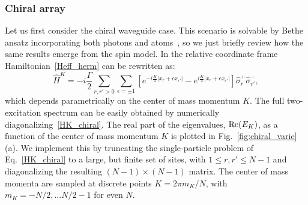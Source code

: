 \documentclass[pra,twocolumn,showpacs,preprintnumbers,amsmath,amssymb]{revtex4-1}
\begin{document}
\subsubsection{Chiral array}\label{Sec_chiral2ex}

Let us first consider the chiral waveguide case. This scenario is solvable by Bethe ansatz incorporating both photons and atoms~\cite{mahmo_calajo}, so we just briefly review how the same results emerge from the spin model. In the relative coordinate frame  Hamiltonian~\eqref{Heff_herm} can be rewritten as:
\begin{equation}\label{HK_chiral}
\hat H^K=-i\frac{\Gamma}{2}\sum_{r,r'>0}\sum_{\epsilon=\pm1}\left[e^{-i\frac{K}{2}|x_r+\epsilon x_{r'}|}-e^{i\frac{K}{2}|x_r+\epsilon x_{r'}|}\right]\hat\sigma^+_{r}\hat\sigma^-_{r'},
\end{equation}
which depends parametrically on the center of mass momentum $K$.
The full two-excitation spectrum can be easily obtained 
by numerically diagonalizing~\eqref{HK_chiral}. The real part of the eigenvalues, ${\rm Re}(E_K)$, as a function of the center of mass momentum $K$ is plotted in  Fig.~\ref{fig:chiral_varie}(a).  We implement this by truncating the single-particle problem of Eq.~\eqref{HK_chiral} to a large, but finite set of sites, with $1\leq r,r' \leq N-1$ and diagonalizing the resulting $(N-1)\times (N-1)$ matrix. The center of mass momenta are sampled at discrete points $K=2\pi m_K/N$, with $m_K=-N/2,...N/2-1$ for even $N$.
\end{document}
